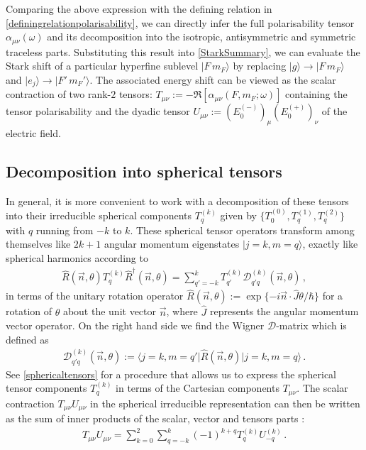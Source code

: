 \documentclass[../Thesis-IJspeert.tex]{subfiles}
\begin{document}
Comparing the above expression with the defining relation in \autoref{definingrelationpolarisability}, we can directly infer the full polarisability tensor $\alpha_{\mu\nu}(\omega)$ and its decomposition into the isotropic, antisymmetric and symmetric traceless parts. Substituting this result into \autoref{StarkSummary}, we can evaluate the Stark shift of a particular hyperfine sublevel $\vert F\,m_F \rangle$ by replacing $\vert g \rangle \rightarrow \vert F\,m_F \rangle$ and $\vert e_j \rangle \rightarrow \vert F'\,m_F' \rangle$. The associated energy shift can be viewed as the scalar contraction of two rank-$2$ tensors: $T_{\mu\nu}:=-\Re [ \alpha_{\mu \nu}(F,m_F;\omega) ]$ containing the tensor polarisability and the dyadic tensor $U_{\mu\nu}:=( E_0^{(-)} )_\mu ( E_0^{(+)} )_\nu$ of the electric field.
\subsection{Decomposition into spherical tensors}
In general, it is more convenient to work with a decomposition of these tensors into their irreducible spherical components $T_q^{(k)}$ given by $\{T_0^{(0)}, T_{q}^{(1)}, T_{q}^{(2)}\}$ with $q$ running from $-k$ to $k$. These spherical tensor operators transform among themselves like $2k+1$ angular momentum eigenstates $\vert j = k, m = q\rangle$, exactly like spherical harmonics according to
\begin{align}
\hat{R}(\vec{n}, \theta)T_q^{(k)} \hat{R}^\dagger(\vec{n}, \theta)= \sum_{q'=-k}^{k} T_{q'}^{(k)}\mathcal{D}_{q'q}^{(k)}(\vec{n}, \theta)\,,
\end{align}
in terms of the unitary rotation operator $\hat{R}(\vec{n}, \theta):=\exp \{-i\vec{n}\cdot \hat{J}\theta/\hbar\}$ for a rotation of $\theta$ about the unit vector $\vec{n}$, where $\hat{J}$ represents the angular momentum vector operator. On the right hand side we find the Wigner $\mathcal{D}$-matrix which is defined as
\begin{align}
\mathcal{D}_{q'q}^{(k)}(\vec{n}, \theta):=\langle j=k, m=q' \vert \hat{R}(\vec{n}, \theta) \vert j=k, m=q \rangle\,.
\end{align}
See \autoref{sphericaltensors} for a procedure that allows us to express the spherical tensor components $T_q^{(k)}$ in terms of the Cartesian components $T_{\mu\nu}$. The scalar contraction $T_{\mu\nu}U_{\mu\nu}$ in the spherical irreducible representation can then be written as the sum of inner products of the scalar, vector and tensors parts \cite{Man2013}:
\begin{align}
\label{scalarcontraction}
	T_{\mu\nu} U_{\mu\nu} = 
	\sum_{k=0}^{2} \sum_{q=-k}^{k} (-1)^{k+q} T^{(k)}_q U^{(k)}_{-q}\,.
\end{align}
\end{document}
